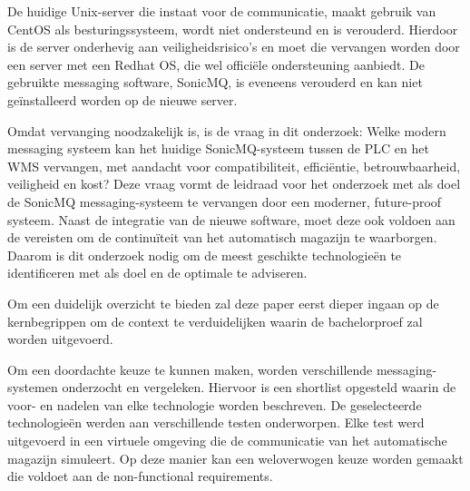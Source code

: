 De huidige Unix-server die instaat voor de communicatie, maakt gebruik van \mbox{CentOS} als besturingssysteem,
wordt niet ondersteund en is verouderd.
Hierdoor is de server onderhevig aan veiligheidsrisico's en moet die vervangen worden door een server met een Redhat OS, 
die wel officiële ondersteuning aanbiedt.
De gebruikte messaging software, SonicMQ, is eveneens verouderd en kan niet geïnstalleerd worden op de nieuwe server. 
\newline

Omdat vervanging noodzakelijk is, is de vraag in dit onderzoek: 
Welke modern messaging systeem kan het huidige SonicMQ-systeem tussen de PLC en het WMS vervangen, 
met aandacht voor compatibiliteit, efficiëntie, betrouwbaarheid, veiligheid en kost?
Deze vraag vormt de leidraad voor het onderzoek met als doel 
de SonicMQ messaging-systeem te vervangen door een moderner, future-proof systeem.
Naast de integratie van de nieuwe software, moet deze ook voldoen aan de vereisten
om de continuïteit van het automatisch magazijn te waarborgen. 
Daarom is dit onderzoek nodig om de meest geschikte technologieën te identificeren met als doel en de optimale te adviseren.
\newline

Om een duidelijk overzicht te bieden zal deze paper eerst dieper ingaan op de kernbegrippen 
om de context te verduidelijken waarin de bachelorproef zal worden uitgevoerd.

Om een doordachte keuze te kunnen maken, worden verschillende messaging-systemen onderzocht en vergeleken.
Hiervoor is een shortlist opgesteld waarin de voor- en nadelen van elke technologie worden beschreven.
De geselecteerde technologieën werden aan verschillende testen onderworpen. 
Elke test werd uitgevoerd in een virtuele omgeving die de communicatie van het automatische magazijn simuleert. 
Op deze manier kan een weloverwogen keuze worden gemaakt die voldoet aan de non-functional requirements.